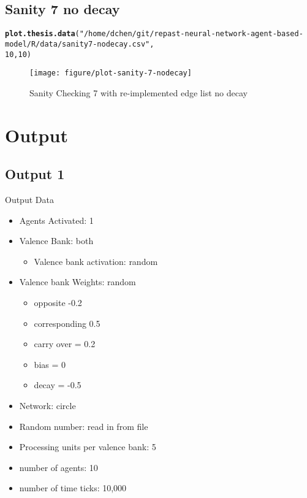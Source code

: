 \documentclass{article}\usepackage[]{graphicx}\usepackage[]{color}
\makeatletter
\def\maxwidth{ %
  \ifdim\Gin@nat@width>\linewidth
    \linewidth
  \else
    \Gin@nat@width
  \fi
}
\newcommand{\hlnum}[1]{\textcolor[rgb]{0.686,0.059,0.569}{#1}}%
\newcommand{\hlstr}[1]{\textcolor[rgb]{0.192,0.494,0.8}{#1}}%
\newcommand{\hlstd}[1]{\textcolor[rgb]{0.345,0.345,0.345}{#1}}%
\newcommand{\hlkwd}[1]{\textcolor[rgb]{0.737,0.353,0.396}{\textbf{#1}}}%
\newenvironment{kframe}{%
 \def\at@end@of@kframe{}%
 \ifinner\ifhmode%
  \def\at@end@of@kframe{\end{minipage}}%
  \begin{minipage}{\columnwidth}%
 \fi\fi%
 \def\FrameCommand##1{\hskip\@totalleftmargin \hskip-\fboxsep
 \colorbox{shadecolor}{##1}\hskip-\fboxsep
     \hskip-\linewidth \hskip-\@totalleftmargin \hskip\columnwidth}%
 \MakeFramed {\advance\hsize-\width
   \@totalleftmargin\z@ \linewidth\hsize
   \@setminipage}}%
 {\par\unskip\endMakeFramed%
 \at@end@of@kframe}
\newenvironment{knitrout}{}{} %
\makeatother
\begin{document}
\subsection{Sanity 7 no decay}
\begin{knitrout}
\color{fgcolor}\begin{kframe}
\begin{alltt}
\hlkwd{plot.thesis.data}\hlstd{(}\hlstr{"/home/dchen/git/repast-neural-network-agent-based-model/R/data/sanity7-nodecay.csv"}\hlstd{,}
    \hlnum{10}\hlstd{,} \hlnum{10}\hlstd{)}
\end{alltt}
\end{kframe}\begin{figure}[]

\texttt{[image: figure/plot-sanity-7-nodecay]} \caption[Sanity Checking 7 with re-implemented edge list no decay]{Sanity Checking 7 with re-implemented edge list no decay\label{fig:plot-sanity-7-nodecay}}
\end{figure}


\end{knitrout}


\newpage
\section{Output}
\subsection{Output 1}
\label{sec:output1}
Output Data
\begin{itemize}
  \item Agents Activated: 1
  \item Valence Bank: both
  \begin{itemize}
      \item Valence bank activation: random
  \end{itemize}
  \item Valence bank Weights: random
  \begin{itemize}
      \item opposite -0.2
      \item corresponding 0.5
      \item carry over = 0.2
      \item bias = 0
      \item decay = -0.5
  \end{itemize}
  \item Network: circle
  \item Random number: read in from file
  \item Processing units per valence bank: 5
  \item number of agents: 10
  \item number of time ticks: 10,000
\end{itemize}
\end{document}
